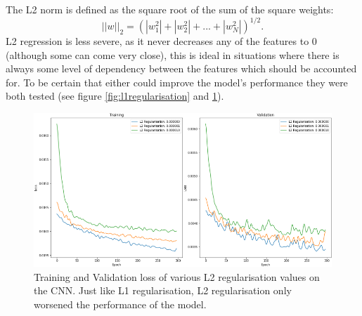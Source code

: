 \documentclass{l4proj}
\begin{document}
The L2 norm is defined as the square root of the sum of the square weights:
\begin{equation}
    ||w||_{2} = \left(|w^2_{1}| + |w^2_{2}| + ... + |w^2_{N}|\right)^{1/2}.
\end{equation}
L2 regression is less severe, as it never decreases any of the features to 0 (although some can come very close), this is ideal in situations where there is always some level of dependency between the features which should be accounted for. To be certain that either could improve the model's performance they were both tested (see figure \ref{fig:l1regularisation} and \ref{fig:l2regularisation}). 
\begin{figure}[H]
    \centering
    \includegraphics[width=0.9\linewidth]{images/L2Regularisation.PNG}    

    \caption{Training and Validation loss of various L2 regularisation values on the CNN. Just like L1 regularisation, L2 regularisation only worsened the performance of the model.}

    \label{fig:l2regularisation} 
\end{figure}
\end{document}
